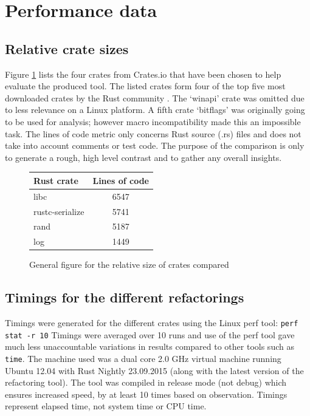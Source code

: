 \section{Performance data}

\subsection{Relative crate sizes}
Figure \ref{Fig:codesize} lists the four crates from Crates.io that have been chosen to help evaluate the produced tool. The listed crates form four of the top five most downloaded crates by the Rust community \cite{cratesio15}. The `winapi' crate was omitted due to less relevance on a Linux platform. A fifth crate `bitflags' was originally going to be used for analysis; however macro incompatibility made this an impossible task. The lines of code metric only concerns Rust source (.rs) files and does not take into account comments or test code. The purpose of the comparison is only to generate a rough, high level contrast and to gather any overall insights. 

\begin{figure}[H]
\begin{center}
    \begin{tabular}{ | l | c |}
    \hline
    \textbf{Rust crate} & \textbf{Lines of code} \\ \hline
    libc & 6547 \\ \hline
    rustc-serialize &  5741 \\ \hline
    rand &   5187 \\ \hline
    log &  1449 \\ \hline
    \end{tabular}
\end{center}

\caption{General figure for the relative size of crates compared}
\label{Fig:codesize}
\end{figure}

\subsection{Timings for the different refactorings}
Timings were generated for the different crates using the Linux perf tool: {\verb|perf stat -r 10|} Timings were averaged over 10 runs and use of the perf tool gave much less unaccountable variations in results compared to other tools such as {\verb|time|}. The machine used was a dual core 2.0 GHz virtual machine running Ubuntu 12.04 with Rust Nightly 23.09.2015 (along with the latest version of the refactoring tool). The tool was compiled in release mode (not debug) which ensures increased speed, by at least 10 times based on observation. Timings represent elapsed time, not system time or CPU time.

